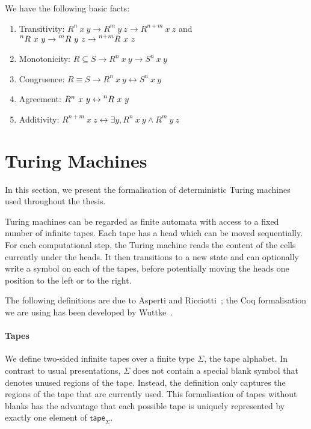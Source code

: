 \begin{proposition}\label{prop:relpower}
  We have the following basic facts:
  \begin{enumerate}
    \item Transitivity: $R^n~x~y \rightarrow R^m~y~z \rightarrow R^{n+m}~x~z$ and $\prescript{n}{}R~x~y \rightarrow \prescript{m}{}R~y~z \rightarrow \prescript{n+m}{}R~x~z$
    \item Monotonicity: $R \subseteq S \rightarrow R^n~x~y \rightarrow S^n~x~y$
    \item Congruence: $R \equiv S \rightarrow R^n~x~y \leftrightarrow S^n~x~y$
    \item Agreement: $R^n~x~y \leftrightarrow \prescript{n}{}R~x~y$
    \item Additivity: $R^{n+m}~x~z \leftrightarrow \exists y, R^n~x~y \land R^m~y~z$
  \end{enumerate}
\end{proposition}

\section{Turing Machines}\label{sec:tm}
In this section, we present the formalisation of deterministic Turing machines used throughout the thesis. 

Turing machines can be regarded as finite automata with access to a fixed number of infinite tapes. Each tape has a head which can be moved sequentially. 
For each computational step, the Turing machine reads the content of the cells currently under the heads. It then transitions to a new state and can optionally write a symbol on each of the tapes, before potentially moving the heads one position to the left or to the right.

The following definitions are due to Asperti and Ricciotti~\cite{asperti_ricciotti}; the Coq formalisation we are using has been developed by Wuttke~\cite{wuttke2017}.

\paragraph{Tapes}
We define two-sided infinite tapes over a finite type $\Sigma$, the tape alphabet. In contrast to usual presentations, $\Sigma$ does not contain a special blank symbol that denotes unused regions of the tape. Instead, the definition only captures the regions of the tape that are currently used. 
This formalisation of tapes without blanks has the advantage that each possible tape is uniquely represented by exactly one element of $\textsf{tape}_\Sigma$. 

